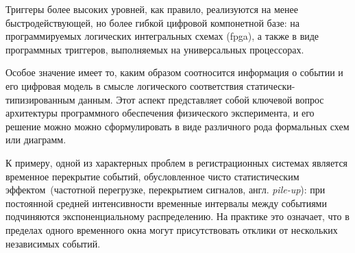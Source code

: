 Триггеры более высоких уровней, как правило, реализуются на менее
быстродействующей, но более гибкой цифровой компонетной базе:
на программируемых
логических интегральных схемах (\acrshort{fpga}), а также в виде
программных триггеров, выполняемых на
универсальных процессорах.


Особое значение имеет то, каким образом соотносится информация о
событии и его цифровая модель в смысле логического соответствия
статически-типизированным данным. Этот аспект представляет собой ключевой вопрос
архитектуры программного обеспечения физического эксперимента, и его решение
можно можно сформулировать в виде различного рода формальных схем или
диаграмм.


К примеру, одной из характерных проблем в регистрационных системах является
временное перекрытие событий, обусловленное чисто статистическим
эффектом~(частотной перегрузке, перекрытием
сигналов, англ. \emph{pile-up}): при постоянной средней интенсивности временные
интервалы между событиями подчиняются экспоненциальному
распределению. На практике это означает, что в пределах одного
временного окна могут присутствовать отклики
от нескольких независимых событий.


